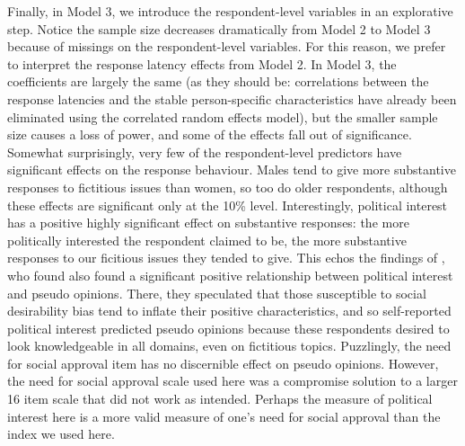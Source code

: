\documentclass[Royal,times,sageh]{sagej}
\begin{document}
Finally, in Model 3, we introduce the respondent-level variables in an
explorative step. Notice the sample size decreases dramatically from
Model 2 to Model 3 because of missings on the respondent-level
variables. For this reason, we prefer to interpret the response latency
effects from Model 2. In Model 3, the coefficients are largely the same
(as they should be: correlations between the response latencies and the
stable person-specific characteristics have already been eliminated
using the correlated random effects model), but the smaller sample size
causes a loss of power, and some of the effects fall out of
significance. Somewhat surprisingly, very few of the respondent-level
predictors have significant effects on the response behaviour. Males
tend to give more substantive responses to fictitious issues than women,
so too do older respondents, although these effects are significant only
at the 10\% level. Interestingly, political interest has a positive
highly significant effect on substantive responses: the more politically
interested the respondent claimed to be, the more substantive responses
to our ficitious issues they tended to give. This echos the findings of
\citet{Sturgis2010}, who found also found a significant positive
relationship between political interest and pseudo opinions. There, they
speculated that those susceptible to social desirability bias tend to
inflate their positive characteristics, and so self-reported political
interest predicted pseudo opinions because these respondents desired to
look knowledgeable in all domains, even on fictitious topics.
Puzzlingly, the need for social approval item has no discernible effect
on pseudo opinions. However, the need for social approval scale used
here was a compromise solution to a larger 16 item scale that did not
work as intended. Perhaps the measure of political interest here is a
more valid measure of one's need for social approval than the index we
used here.
\end{document}
